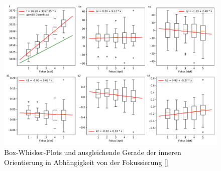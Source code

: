 \documentclass[./00PhotoBox.tex]{subfiles}
\begin{document}
\begin{figure}
    \centering
    \includegraphics[width=1\textwidth]{./img/naeherungswerte_diagramm.pdf}
    \caption{Box-Whisker-Plots und ausgleichende Gerade der inneren Orientierung in Abhängigkeit von der Fokussierung []} %
    \label{img:naeherungswerte} %
\end{figure}

\biblio
\end{document}
